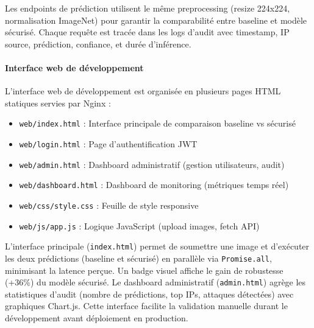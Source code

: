 Les endpoints de prédiction utilisent le même preprocessing (resize 224x224, normalisation ImageNet) pour garantir la comparabilité entre baseline et modèle sécurisé. Chaque requête est tracée dans les logs d'audit avec timestamp, IP source, prédiction, confiance, et durée d'inférence.

\paragraph{Interface web de développement}

L'interface web de développement est organisée en plusieurs pages HTML statiques servies par Nginx :

\begin{itemize}
    \item \texttt{web/index.html} : Interface principale de comparaison baseline vs sécurisé
    \item \texttt{web/login.html} : Page d'authentification JWT
    \item \texttt{web/admin.html} : Dashboard administratif (gestion utilisateurs, audit)
    \item \texttt{web/dashboard.html} : Dashboard de monitoring (métriques temps réel)
    \item \texttt{web/css/style.css} : Feuille de style responsive
    \item \texttt{web/js/app.js} : Logique JavaScript (upload images, fetch API)
\end{itemize}

L'interface principale (\texttt{index.html}) permet de soumettre une image et d'exécuter les deux prédictions (baseline et sécurisé) en parallèle via \texttt{Promise.all}, minimisant la latence perçue. Un badge visuel affiche le gain de robustesse (+36\%) du modèle sécurisé. Le dashboard administratif (\texttt{admin.html}) agrège les statistiques d'audit (nombre de prédictions, top IPs, attaques détectées) avec graphiques Chart.js. Cette interface facilite la validation manuelle durant le développement avant déploiement en production.
